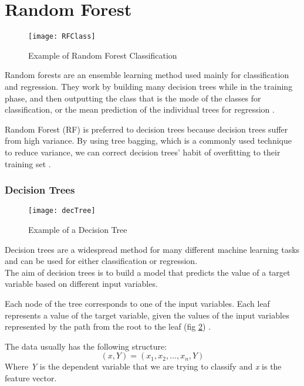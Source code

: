 \clearpage

\section{Random Forest} \label{random_forest}

\begin{figure}[H]
	\centering
	\texttt{[image: RFClass]}
	\caption{Example of Random Forest Classification \cite{medium:RF}}
	\label{fig:RFClass}
\end{figure}

Random forests are an ensemble learning method used mainly for classification and regression. They work by building many decision trees while in the training phase, and then outputting the class that is the mode of the classes for classification, or the mean prediction of the individual trees for regression \cite{wiki:randomforest}\cite{RDF}.

Random Forest (RF) is preferred to decision trees because decision trees suffer from high variance. By using tree bagging, which is a commonly used technique to reduce variance, we can correct decision trees' habit of overfitting to their training set \cite{ESL}.

\subsubsection{Decision Trees}
\begin{figure}[H]
	\centering
	\texttt{[image: decTree]}
	\caption{Example of a Decision Tree \cite{KDNrf}}
	\label{fig:decTree}
\end{figure}

Decision trees are a widespread method for many different machine learning tasks and can be used for either classification or regression.\\
The aim of decision trees is to build a model that predicts the value of a target variable based on different input variables. 

Each node of the tree corresponds to one of the input variables. Each leaf represents a value of the target variable, given the values of the input variables represented by the path from the root to the leaf (fig \ref{fig:decTree}) \cite{wiki:DT}.

The data usually has the following structure: 
\begin{equation}
	(x, Y) = (x_1, x_2, \dots, x_n, Y)
\end{equation}
Where \textit{Y} is the dependent variable that we are trying to classify and \textit{x} is the feature vector.

